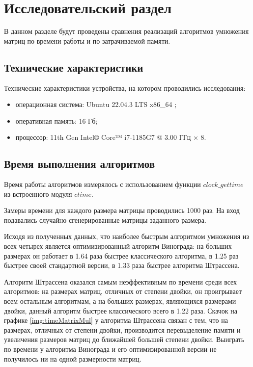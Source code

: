 \chapter{Исследовательский раздел}

В данном разделе будут проведены сравнения реализаций алгоритмов умножения матриц  по времени работы и по затрачиваемой памяти.

\section{Технические характеристики}

Технические характеристики устройства, на котором проводились исследования: 

\begin{itemize}[label=--]
	\item операционная система: Ubuntu 22.04.3 LTS x86\_64 \cite{os};
	\item оперативная память: 16 Гб;
	\item процессор: 11th Gen Intel® Core™ i7-1185G7 @ 3.00 ГГц × 8.
\end{itemize}

\section{Время выполнения алгоритмов}

Время работы алгоритмов измерялось с использованием функции $clock\_gettime$ из встроенного модуля $ctime$. 

Замеры времени для каждого размера матрицы проводились 1000 раз. На вход подавались случайно сгенерированные матрицы заданного размера. 

Исходя из полученных данных, что наиболее быстрым алгоритмом умножения из всех четырех является оптимизированный алгоритм Винограда: на больших размерах он работает в 1.64 раза быстрее классического алгоритма, в 1.25 раз быстрее своей стандартной версии, в 1.33 раза быстрее алгоритма Штрассена.

Алгоритм Штрассена оказался самым неэффективным по времени среди всех алгоритмов: на размерах матриц, отличных от степени двойки, он проигрывает всем остальным алгоритмам, а на больших размерах, являющихся размерами двойки, данный алгоритм быстрее классического всего в 1.22 раза.
Скачок на графике \ref{img:timeMatrixMul} у алгоритма Штрассена связан с тем, что на размерах, отличных от степени двойки, производится перевыделение памяти и увеличения размеров матриц до ближайшей большей степени двойки. Выиграть по времени у алгоритма Винограда и его оптимизированной версии не получилось ни на одной размерности матриц.

